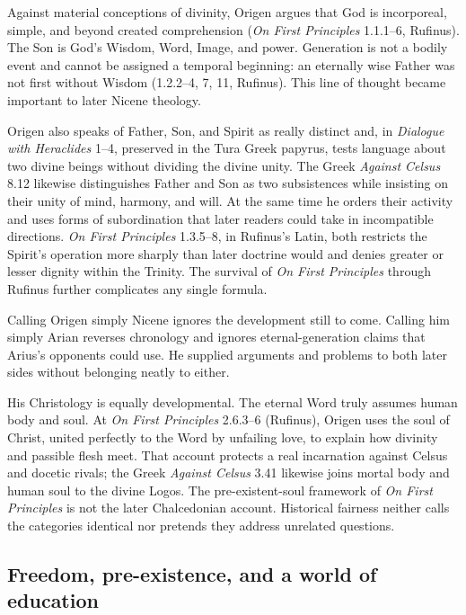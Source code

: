 Against material conceptions of divinity, Origen argues that God is
incorporeal, simple, and beyond created comprehension (\emph{On First
Principles} 1.1.1--6, Rufinus). The Son is God's Wisdom, Word, Image, and power.
Generation is not a bodily event and cannot be assigned a temporal beginning:
an eternally wise Father was not first without Wisdom (1.2.2--4, 7, 11,
Rufinus). This line of thought became important to later Nicene theology.

Origen also speaks of Father, Son, and Spirit as really distinct and, in
\emph{Dialogue with Heraclides} 1--4, preserved in the Tura Greek papyrus,
tests language about two divine beings without dividing the divine unity.
The Greek \emph{Against Celsus} 8.12 likewise distinguishes Father and Son as
two subsistences while insisting on their unity of mind, harmony, and will. At
the same time he orders their activity and uses
forms of subordination that later readers could take in incompatible
directions. \emph{On First Principles} 1.3.5--8, in Rufinus's Latin, both
restricts the Spirit's operation more sharply than later doctrine would and
denies greater or lesser dignity within the Trinity. The
survival of \emph{On First Principles} through Rufinus further complicates any
single formula.

Calling Origen simply Nicene ignores the development still to come. Calling
him simply Arian reverses chronology and ignores eternal-generation claims
that Arius's opponents could use. He supplied arguments and problems to both
later sides without belonging neatly to either.

His Christology is equally developmental. The eternal Word truly assumes human
body and soul. At \emph{On First Principles} 2.6.3--6 (Rufinus), Origen uses
the soul of Christ, united perfectly to the Word by unfailing love, to explain
how divinity and passible flesh meet. That account protects a real incarnation
against Celsus and docetic rivals; the Greek \emph{Against Celsus} 3.41
likewise joins mortal body and human soul to the divine Logos. The
pre-existent-soul framework of \emph{On First Principles} is not the later
Chalcedonian account. Historical
fairness neither calls the categories identical nor pretends they address
unrelated questions.

\subsection{Freedom, pre-existence, and a world of education}

